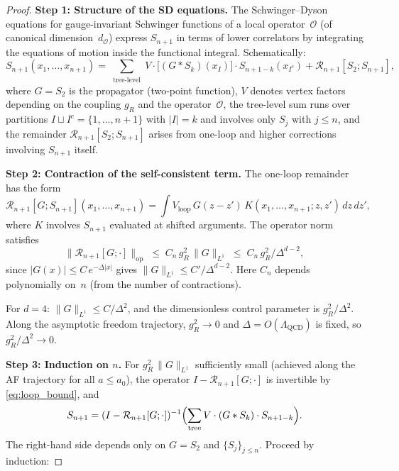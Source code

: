 \documentclass[11pt,a4paper]{article}
\theoremstyle{plain}
\theoremstyle{definition}
\theoremstyle{remark}
\begin{document}
\begin{proof}
\textbf{Step 1: Structure of the SD equations.}
The Schwinger--Dyson equations for gauge-invariant
Schwinger functions of a local operator~$\mathcal{O}$
(of canonical dimension~$d_{\mathcal{O}}$) express
$S_{n+1}$ in terms of lower correlators by integrating
the equations of motion inside the functional integral.
Schematically:
\begin{equation}\label{eq:sd_structure}
  S_{n+1}(x_1,\ldots,x_{n+1}) =
  \sum_{\substack{\text{tree-level}}}
  V \cdot \bigl[(G * S_k)(x_I)\bigr]
  \cdot S_{n+1-k}(x_{I^c})
  + \mathcal{R}_{n+1}[S_2; S_{n+1}],
\end{equation}
where $G = S_2$ is the propagator (two-point function),
$V$ denotes vertex factors depending on the coupling
$g_R$ and the operator~$\mathcal{O}$, the tree-level sum
runs over partitions $I \sqcup I^c = \{1,\ldots,n+1\}$
with $|I| = k$ and involves only $S_j$ with $j \leq n$,
and the remainder
$\mathcal{R}_{n+1}[S_2; S_{n+1}]$ arises from
one-loop and higher corrections involving $S_{n+1}$ itself.

\smallskip
\textbf{Step 2: Contraction of the self-consistent term.}
The one-loop remainder has the form
\[
  \mathcal{R}_{n+1}[G; S_{n+1}](x_1,\ldots,x_{n+1})
  = \int V_{\mathrm{loop}}\,G(z{-}z')\,
  K(x_1,\ldots,x_{n+1}; z, z')\,dz\,dz',
\]
where $K$ involves $S_{n+1}$ evaluated at shifted
arguments.  The operator norm satisfies
\begin{equation}\label{eq:loop_bound}
  \|\mathcal{R}_{n+1}[G; \cdot]\|_{\mathrm{op}}
  \;\leq\; C_n\,g_R^2\,\|G\|_{L^1}
  \;\leq\; C_n\,g_R^2 / \Delta^{d-2},
\end{equation}
since $|G(x)| \leq C\,e^{-\Delta|x|}$ gives
$\|G\|_{L^1} \leq C'/\Delta^{d-2}$.  Here $C_n$
depends polynomially on~$n$ (from the number of
contractions).

For $d = 4$: $\|G\|_{L^1} \leq C/\Delta^2$, and the
dimensionless control parameter is $g_R^2/\Delta^2$.
Along the asymptotic freedom trajectory,
$g_R^2 \to 0$ and $\Delta = O(\Lambda_{\mathrm{QCD}})$
is fixed, so $g_R^2/\Delta^2 \to 0$.

\smallskip
\textbf{Step 3: Induction on $n$.}
For $g_R^2\,\|G\|_{L^1}$ sufficiently small
(achieved along the AF trajectory for all
$a \leq a_0$), the operator
$I - \mathcal{R}_{n+1}[G; \cdot]$ is invertible
by \eqref{eq:loop_bound}, and
\begin{equation}\label{eq:sd_solved}
  S_{n+1} = (I - \mathcal{R}_{n+1}[G;\cdot])^{-1}
  \Bigl(\sum_{\text{tree}} V \cdot
  (G * S_k) \cdot S_{n+1-k}\Bigr).
\end{equation}
The right-hand side depends only on $G = S_2$ and
$\{S_j\}_{j \leq n}$.  Proceed by induction:


\end{proof}
\end{document}
